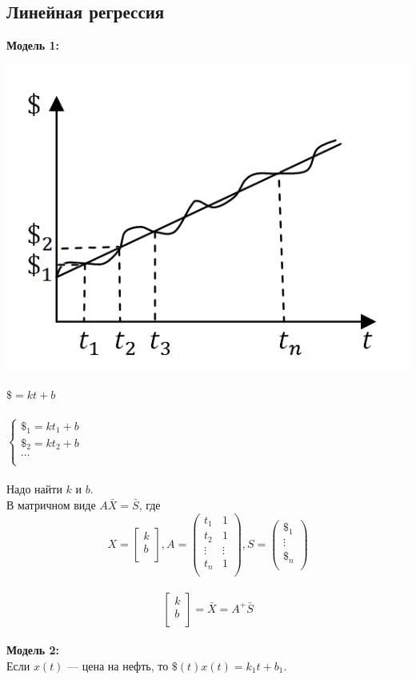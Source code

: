 \subsection{Линейная регрессия}
\textbf{Модель 1:}\begin{center}
    \includegraphics[scale=0.7]{l2_2.png}\end{center}
$\$ = kt+b$\\ \\
$
\left\{  
\begin{array}{ccl}  
\$_1=kt_1+b\\
\$_2=kt_2+b\\
\cdots\\
\end{array}   
\right.  
$\\ \\
Надо найти $k$ и $b$.\\
В матричном виде $A\bar X=\bar S$, где\\
\[X = \begin{bmatrix}
k\\         
b\\
\end{bmatrix}, A = \begin{pmatrix}
t_1 & 1\\         
t_2 & 1\\
\vdots & \vdots\\
t_n & 1\\
\end{pmatrix}, S = \begin{pmatrix}
\$_1\\         
\vdots\\
\$_n\\
\end{pmatrix}\]\\
\[\begin{bmatrix}
k\\         
b\\
\end{bmatrix} = \bar X = A^+\bar S\]\\
\textbf{Модель 2:}\\
Если $x(t)$ --- цена на нефть, то $\$(t)x(t)=k_1t+b_1$.\\
\\
